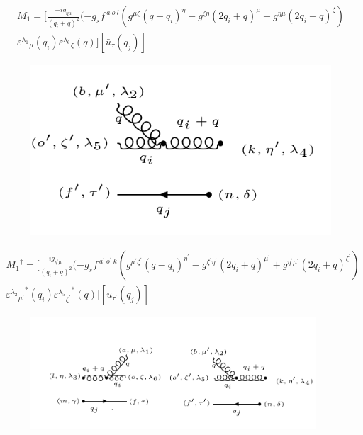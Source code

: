 \begin{equation}
\begin{split}
M_1=[\frac{-ig_{{\eta}{\mu}}}{(q_i +q)^2}(-g_s f^{\:a\:o\:l}(g^{{\mu}{\zeta}}(q-q_i)^{\eta}-g^{{\zeta}{\eta}}(2q_i +q)^{\mu}+g^{{\eta}{\mu}}(2q_i +q)^{\zeta})\\
{\varepsilon^{\lambda_1}}_{\mu} (q_i) {\varepsilon^{\lambda_6}}_{\zeta} (q)][\bar{u}_{\tau}(q_j)]
\end{split}
\end{equation}
\begin{figure}[ht!]
\centering
\includegraphics[scale=0.7]{images/ggqM1dagger.png}
\end{figure}
\begin{equation}
\begin{split}
{M_1}^{\dagger}=[\frac{ig_{{{\eta}^{\prime}}{{\mu}^{\prime}}}}{(q_i +q)^2}(-g_s f^{\:a^{\prime}\:o^{\prime}\:k}(g^{{{\mu}^{\prime}}{{\zeta}^{\prime}}}(q-q_i)^{{\eta}^{\prime}}-g^{{{\zeta}^{\prime}}{{\eta}^{\prime}}}(2q_i +q)^{{\mu}^{\prime}}+g^{{{\eta}^{\prime}}{{\mu}^{\prime}}}(2q_i +q)^{{\zeta}^{\prime}})\\
{{\varepsilon^{\lambda_2}}_{{\mu}^{\prime}}}^* (q_i) {{\varepsilon^{\lambda_5}}_{{\zeta}^{\prime}}}^* (q)][{u}_{{\tau}^{\prime}}(q_j)]
\end{split}
\end{equation}
\begin{figure}[ht!]
\centering
\includegraphics[width=0.95\textwidth]{images/ggqM1squer.png}
\end{figure}
